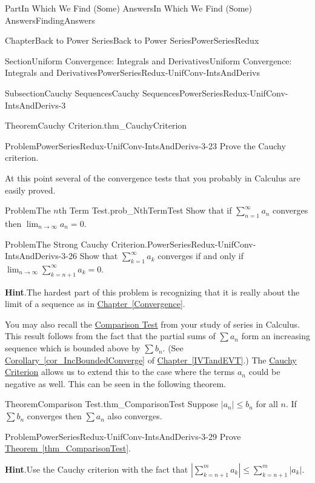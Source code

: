 \documentclass[oneside,10pt,]{book}
\newcommand{\blocktitlefont}{\relax}
\newcommand{\xreffont}{\relax}
\numberwithin{equation}{part}
\newcommand{\abs}[1]{\left|#1\right|}
\def\limit#1#2#3{{\displaystyle\lim_{#1\rightarrow #2}#3}}
\begin{document}
\begin{partptx}{Part}{In Which We Find (Some) Answers}{}{In Which We Find (Some) Answers}{}{}{FindingAnswers}
\begin{chapterptx}{Chapter}{Back to Power Series}{}{Back to Power Series}{}{}{PowerSeriesRedux}
\begin{sectionptx}{Section}{Uniform Convergence: Integrals and Derivatives}{}{Uniform Convergence: Integrals and Derivatives}{}{}{PowerSeriesRedux-UnifConv-IntsAndDerivs}
\begin{subsectionptx}{Subsection}{Cauchy Sequences}{}{Cauchy Sequences}{}{}{PowerSeriesRedux-UnifConv-IntsAndDerivs-3}
\begin{theorem}{Theorem}{Cauchy Criterion.}{}{thm_CauchyCriterion}
%
\end{theorem}
\begin{problem}{Problem}{}{PowerSeriesRedux-UnifConv-IntsAndDerivs-3-23}%
Prove the Cauchy criterion.%
\end{problem}
At this point several of the convergence tests that you probably in Calculus are easily proved.%
\begin{problem}{Problem}{The \(n\)th Term Test.}{prob_NthTermTest}%
Show that if \(\sum_{n=1}^\infty a_n\) converges then \(\limit{n}{\infty}{a_n}=0\).%
\end{problem}
\begin{problem}{Problem}{The Strong Cauchy Criterion.}{PowerSeriesRedux-UnifConv-IntsAndDerivs-3-26}%
Show that \(\displaystyle\sum_{k=1}^\infty a_k\) converges if and only if \(\limit{n}{\infty}{\sum_{k=n+1}^\infty a_k}=0\).%
\par\smallskip%
\noindent\textbf{\blocktitlefont Hint}.\hypertarget{PowerSeriesRedux-UnifConv-IntsAndDerivs-3-26-4}{}\quad{}The hardest part of this problem is recognizing that it is really about the limit of a sequence as in \hyperref[Convergence]{Chapter~{\xreffont\ref{Convergence}}}.%
\end{problem}
You may also recall the \hyperref[thm_ComparisonTest]{Comparison Test} from your study of series in Calculus.  This result follows from the fact that the partial sums of \(\sum a_n\) form an increasing sequence which is bounded above by \(\sum b_n\).  (See \hyperref[cor_IncBoundedConverge]{Corollary~{\xreffont\ref{cor_IncBoundedConverge}}} of \hyperref[IVTandEVT]{Chapter~{\xreffont\ref{IVTandEVT}}}.)  The \hyperref[thm_CauchyCriterion]{Cauchy Criterion} allows us to extend this to the case where the terms \(a_n\) could be negative as well.  This can be seen in the following theorem.%
\begin{theorem}{Theorem}{Comparison Test.}{}{thm_ComparisonTest}%
%
Suppose \(|a_n|\leq b_n\) for all \(n\).  If \(\sum
b_n\) converges then \(\sum a_n\) also converges.%
\end{theorem}
\begin{problem}{Problem}{}{PowerSeriesRedux-UnifConv-IntsAndDerivs-3-29}%
Prove \hyperref[thm_ComparisonTest]{Theorem~{\xreffont\ref{thm_ComparisonTest}}}.%
\par\smallskip%
\noindent\textbf{\blocktitlefont Hint}.\hypertarget{PowerSeriesRedux-UnifConv-IntsAndDerivs-3-29-4}{}\quad{}Use the Cauchy criterion with the fact that \(\abs{\sum_{k=n+1}^ma_k}\leq\sum_{k=n+1}^m\abs{a_k}\).%
\end{problem}

\end{subsectionptx}
\end{sectionptx}
\end{chapterptx}
\end{partptx}
\end{document}
